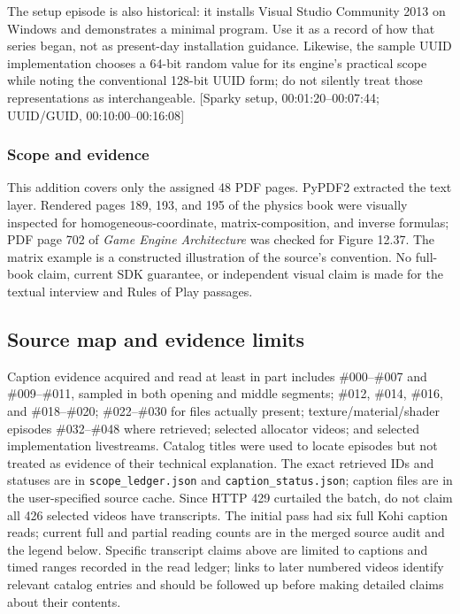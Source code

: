 The setup episode is also historical: it installs Visual Studio Community 2013 on Windows and demonstrates a minimal program. Use it as a record of how that series began, not as present-day installation guidance. Likewise, the sample UUID implementation chooses a 64-bit random value for its engine's practical scope while noting the conventional 128-bit UUID form; do not silently treat those representations as interchangeable. {[}Sparky setup, 00:01:20--00:07:44; UUID/GUID, 00:10:00--00:16:08{]}

\subsubsection{Scope and evidence}\label{06-engine-ii-ch042-scope-and-evidence}

This addition covers only the assigned 48 PDF pages. PyPDF2 extracted the text layer. Rendered pages 189, 193, and 195 of the physics book were visually inspected for homogeneous-coordinate, matrix-composition, and inverse formulas; PDF page 702 of \emph{Game Engine Architecture} was checked for Figure 12.37. The matrix example is a constructed illustration of the source's convention. No full-book claim, current SDK guarantee, or independent visual claim is made for the textual interview and Rules of Play passages.

\subsection{Source map and evidence limits}\label{06-engine-ii-ch042-source-map-and-evidence-limits}

Caption evidence acquired and read at least in part includes \#000--\#007 and \#009--\#011, sampled in both opening and middle segments; \#012, \#014, \#016, and \#018--\#020; \#022--\#030 for files actually present; texture/material/shader episodes \#032--\#048 where retrieved; selected allocator videos; and selected implementation livestreams. Catalog titles were used to locate episodes but not treated as evidence of their technical explanation. The exact retrieved IDs and statuses are in \texttt{scope\_ledger.json} and \texttt{caption\_status.json}; caption files are in the user-specified source cache. Since HTTP 429 curtailed the batch, do not claim all 426 selected videos have transcripts. The initial pass had six full Kohi caption reads; current full and partial reading counts are in the merged source audit and the legend below. Specific transcript claims above are limited to captions and timed ranges recorded in the read ledger; links to later numbered videos identify relevant catalog entries and should be followed up before making detailed claims about their contents.

